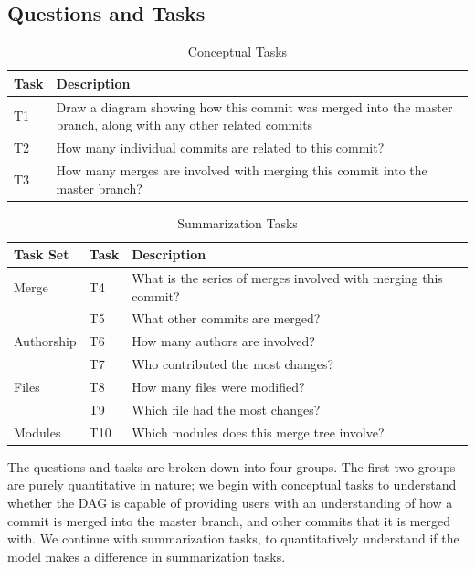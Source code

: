 \documentclass[draft]{IEEEtran}
\begin{document}
\subsection{Questions and Tasks}
\label{sub:questions}

\begin{table}[htpb]
  \centering
  \caption{Conceptual Tasks }
  \label{tab:conceptual_tasks}
  \begin{tabulary}{0.9\textwidth}{LL}
    \toprule
    Task & Description\\
    \midrule
    T1 & Draw a diagram showing how this commit was merged into the master branch, along with any other related commits\\
    T2 & How many individual commits are related to this commit?\\
    T3 & How many merges are involved with merging this commit into the master branch?\\
    \bottomrule
  \end{tabulary}
\end{table}

\begin{table}[htpb]
  \centering
  \caption{Summarization Tasks}
  \label{tab:summarization_tasks}
  \begin{tabulary}{\linewidth}{LLL}
    \toprule
    Task Set   & Task & Description\\\midrule
    Merge      & T4   & What is the series of merges involved with merging this
    commit?\\
               & T5   & What other commits are merged?\\
    Authorship & T6   & How many authors are involved?\\
               & T7   & Who contributed the most changes?\\
    Files      & T8   & How many files were modified?\\
               & T9   & Which file had the most changes?\\
    Modules    & T10  & Which modules does this merge tree involve?\\
    \bottomrule
  \end{tabulary}
\end{table}

The questions and tasks are broken down into four groups. The first two
groups are purely quantitative in nature; we begin with conceptual tasks
to understand whether the DAG is capable of providing users with an
understanding of how a commit is merged into the master branch, and
other commits that it is merged with. We continue with summarization
tasks, to quantitatively understand if the \mt model makes a difference
in summarization tasks.
\end{document}

